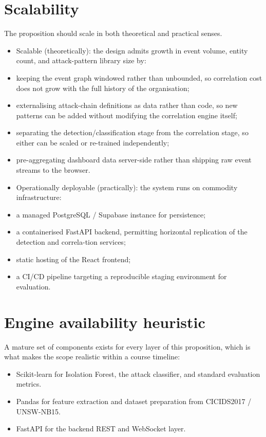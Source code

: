 \documentclass[12pt]{article}
\begin{document}
\section{Scalability}

The proposition should scale in both theoretical and practical senses.

\begin{itemize}
  \item Scalable (theoretically): the design admits growth in event volume, entity count, and attack-pattern library size by:
  \item keeping the event graph windowed rather than unbounded, so correlation cost does not grow with the full history of the organisation;
  \item externalising attack-chain definitions as data rather than code, so new patterns can be added without modifying the correlation engine itself;
  \item separating the detection/classification stage from the correlation stage, so either can be scaled or re-trained independently;
  \item pre-aggregating dashboard data server-side rather than shipping raw event streams to the browser.
  \item Operationally deployable (practically): the system runs on commodity infrastructure:
  \item a managed PostgreSQL / Supabase instance for persistence;
  \item a containerised FastAPI backend, permitting horizontal replication of the detection and correla-tion services;
  \item static hosting of the React frontend;
  \item a CI/CD pipeline targeting a reproducible staging environment for evaluation.
\end{itemize}

\section{Engine availability heuristic}

A mature set of components exists for every layer of this proposition, which is what makes the scope realistic within a course timeline:

\begin{itemize}
  \item Scikit-learn for Isolation Forest, the attack classifier, and standard evaluation metrics.
  \item Pandas for feature extraction and dataset preparation from CICIDS2017 / UNSW-NB15.
  \item FastAPI for the backend REST and WebSocket layer.
\end{itemize}
\end{document}
